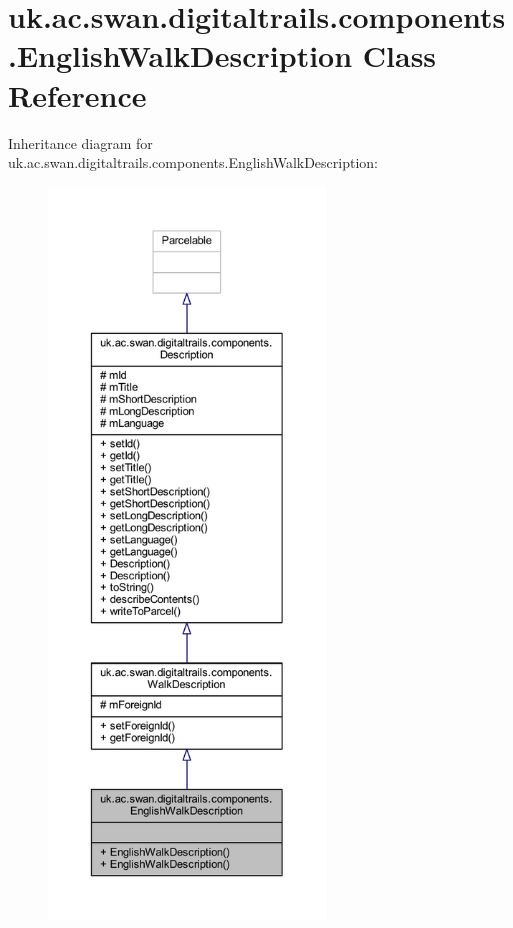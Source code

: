 \hypertarget{classuk_1_1ac_1_1swan_1_1digitaltrails_1_1components_1_1_english_walk_description}{\section{uk.\+ac.\+swan.\+digitaltrails.\+components.\+English\+Walk\+Description Class Reference}
\label{classuk_1_1ac_1_1swan_1_1digitaltrails_1_1components_1_1_english_walk_description}
}


Inheritance diagram for uk.\+ac.\+swan.\+digitaltrails.\+components.\+English\+Walk\+Description\+:
\nopagebreak
\begin{figure}[H]
\begin{center}
\leavevmode
\includegraphics[height=550pt]{classuk_1_1ac_1_1swan_1_1digitaltrails_1_1components_1_1_english_walk_description__inherit__graph}
\end{center}
\end{figure}


